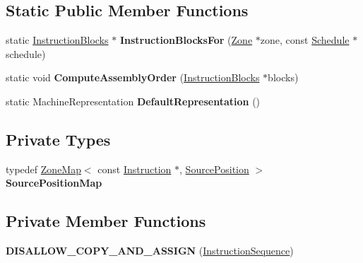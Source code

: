 \subsection*{Static Public Member Functions}
\begin{DoxyCompactItemize}
\item 
static \hyperlink{classv8_1_1internal_1_1_zone_vector}{Instruction\+Blocks} $\ast$ {\bfseries Instruction\+Blocks\+For} (\hyperlink{classv8_1_1internal_1_1_zone}{Zone} $\ast$zone, const \hyperlink{classv8_1_1internal_1_1compiler_1_1_schedule}{Schedule} $\ast$schedule)\hypertarget{classv8_1_1internal_1_1compiler_1_1_instruction_sequence_a6f677c42a8af001db192a383a038054e}{}\label{classv8_1_1internal_1_1compiler_1_1_instruction_sequence_a6f677c42a8af001db192a383a038054e}

\item 
static void {\bfseries Compute\+Assembly\+Order} (\hyperlink{classv8_1_1internal_1_1_zone_vector}{Instruction\+Blocks} $\ast$blocks)\hypertarget{classv8_1_1internal_1_1compiler_1_1_instruction_sequence_a0f4317a96c7cfc0a27af5172ca524633}{}\label{classv8_1_1internal_1_1compiler_1_1_instruction_sequence_a0f4317a96c7cfc0a27af5172ca524633}

\item 
static Machine\+Representation {\bfseries Default\+Representation} ()\hypertarget{classv8_1_1internal_1_1compiler_1_1_instruction_sequence_ac54100a4cfc4148097448cb925d0bbfe}{}\label{classv8_1_1internal_1_1compiler_1_1_instruction_sequence_ac54100a4cfc4148097448cb925d0bbfe}

\end{DoxyCompactItemize}
\subsection*{Private Types}
\begin{DoxyCompactItemize}
\item 
typedef \hyperlink{classv8_1_1internal_1_1_zone_map}{Zone\+Map}$<$ const \hyperlink{classv8_1_1internal_1_1compiler_1_1_instruction}{Instruction} $\ast$, \hyperlink{classv8_1_1internal_1_1compiler_1_1_source_position}{Source\+Position} $>$ {\bfseries Source\+Position\+Map}\hypertarget{classv8_1_1internal_1_1compiler_1_1_instruction_sequence_a36f1df03567579b138d8881bc80d19dd}{}\label{classv8_1_1internal_1_1compiler_1_1_instruction_sequence_a36f1df03567579b138d8881bc80d19dd}

\end{DoxyCompactItemize}
\subsection*{Private Member Functions}
\begin{DoxyCompactItemize}
\item 
{\bfseries D\+I\+S\+A\+L\+L\+O\+W\+\_\+\+C\+O\+P\+Y\+\_\+\+A\+N\+D\+\_\+\+A\+S\+S\+I\+GN} (\hyperlink{classv8_1_1internal_1_1compiler_1_1_instruction_sequence}{Instruction\+Sequence})\hypertarget{classv8_1_1internal_1_1compiler_1_1_instruction_sequence_a17703eec0ddcb310878765b658b27c8c}{}\label{classv8_1_1internal_1_1compiler_1_1_instruction_sequence_a17703eec0ddcb310878765b658b27c8c}

\end{DoxyCompactItemize}
